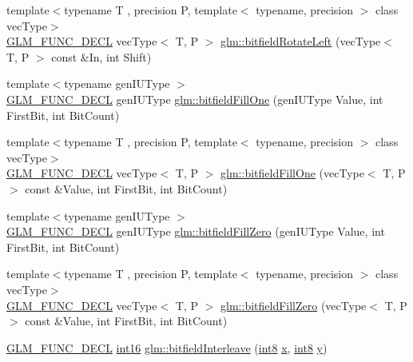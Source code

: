 \begin{DoxyCompactItemize}
\item 
{\footnotesize template$<$typename T , precision P, template$<$ typename, precision $>$ class vec\+Type$>$ }\\\mbox{\hyperlink{setup_8hpp_ab2d052de21a70539923e9bcbf6e83a51}{G\+L\+M\+\_\+\+F\+U\+N\+C\+\_\+\+D\+E\+CL}} vec\+Type$<$ T, P $>$ \mbox{\hyperlink{group__gtc__bitfield_ga410d130917d85b865718e3ebc32cf0ef}{glm\+::bitfield\+Rotate\+Left}} (vec\+Type$<$ T, P $>$ const \&In, int Shift)
\item 
{\footnotesize template$<$typename gen\+I\+U\+Type $>$ }\\\mbox{\hyperlink{setup_8hpp_ab2d052de21a70539923e9bcbf6e83a51}{G\+L\+M\+\_\+\+F\+U\+N\+C\+\_\+\+D\+E\+CL}} gen\+I\+U\+Type \mbox{\hyperlink{group__gtc__bitfield_ga46f9295abe3b5c7658f5b13c7f819f0a}{glm\+::bitfield\+Fill\+One}} (gen\+I\+U\+Type Value, int First\+Bit, int Bit\+Count)
\item 
{\footnotesize template$<$typename T , precision P, template$<$ typename, precision $>$ class vec\+Type$>$ }\\\mbox{\hyperlink{setup_8hpp_ab2d052de21a70539923e9bcbf6e83a51}{G\+L\+M\+\_\+\+F\+U\+N\+C\+\_\+\+D\+E\+CL}} vec\+Type$<$ T, P $>$ \mbox{\hyperlink{group__gtc__bitfield_gad789042e84e8292ae95dc1af856f2ad5}{glm\+::bitfield\+Fill\+One}} (vec\+Type$<$ T, P $>$ const \&Value, int First\+Bit, int Bit\+Count)
\item 
{\footnotesize template$<$typename gen\+I\+U\+Type $>$ }\\\mbox{\hyperlink{setup_8hpp_ab2d052de21a70539923e9bcbf6e83a51}{G\+L\+M\+\_\+\+F\+U\+N\+C\+\_\+\+D\+E\+CL}} gen\+I\+U\+Type \mbox{\hyperlink{group__gtc__bitfield_ga697b86998b7d74ee0a69d8e9f8819fee}{glm\+::bitfield\+Fill\+Zero}} (gen\+I\+U\+Type Value, int First\+Bit, int Bit\+Count)
\item 
{\footnotesize template$<$typename T , precision P, template$<$ typename, precision $>$ class vec\+Type$>$ }\\\mbox{\hyperlink{setup_8hpp_ab2d052de21a70539923e9bcbf6e83a51}{G\+L\+M\+\_\+\+F\+U\+N\+C\+\_\+\+D\+E\+CL}} vec\+Type$<$ T, P $>$ \mbox{\hyperlink{group__gtc__bitfield_gaddba3196316b0bd240295b09b43c2958}{glm\+::bitfield\+Fill\+Zero}} (vec\+Type$<$ T, P $>$ const \&Value, int First\+Bit, int Bit\+Count)
\item 
\mbox{\hyperlink{setup_8hpp_ab2d052de21a70539923e9bcbf6e83a51}{G\+L\+M\+\_\+\+F\+U\+N\+C\+\_\+\+D\+E\+CL}} \mbox{\hyperlink{group__gtc__type__precision_ga2945a61d12771f8954994fcddf02b021}{int16}} \mbox{\hyperlink{group__gtc__bitfield_ga479134317bc95d99f2b2e235d3db287b}{glm\+::bitfield\+Interleave}} (\mbox{\hyperlink{group__gtc__type__precision_ga96254f9c1c4506fc8eb5cf3301ce8565}{int8}} \mbox{\hyperlink{glad_8h_a92d0386e5c19fb81ea88c9f99644ab1d}{x}}, \mbox{\hyperlink{group__gtc__type__precision_ga96254f9c1c4506fc8eb5cf3301ce8565}{int8}} \mbox{\hyperlink{glad_8h_a66ddd433d2cacfe27f5906b7e86faeed}{y}})

\end{DoxyCompactItemize}

